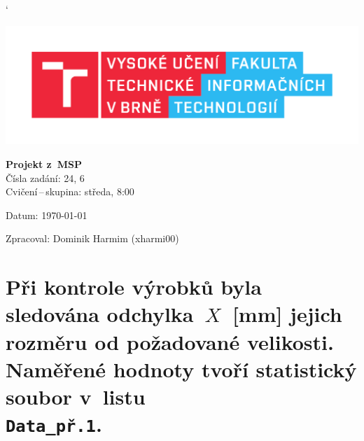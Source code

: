 \documentclass[a4paper, 11pt]{article}
\begin{document}
	\catcode`

	\begin{titlepage}
		\begin{center}
			\includegraphics[width=.77 \linewidth]{img/FIT_logo.pdf}


			\Huge{\textbf{Projekt z~MSP}} \\
			\LARGE{Čísla zadání: 24, 6} \\
			\Large{Cvičení\,--\,skupina: středa, 8:00}

		\end{center}

		\begin{minipage}{.47 \textwidth}
			\Large
			Datum: \today
		\end{minipage}
%
		\hfill
%
		\begin{minipage}[r]{.49 \textwidth}
			\Large
			Zpracoval: Dominik Harmim (xharmi00)
		\end{minipage}
	\end{titlepage}


	\section{
		Při kontrole výrobků byla sledována odchylka~$ X $~[mm] jejich
		rozměru od požadované velikosti. Naměřené hodnoty tvoří statistický
		soubor v~listu \\ \texttt{Data\_př.1}.
	}
\end{document}
